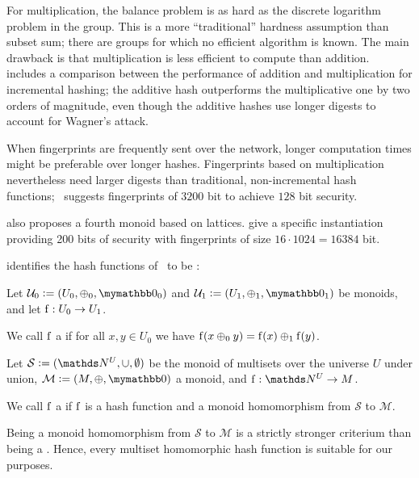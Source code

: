 \documentclass[conference]{IEEEtran}
\begin{document}
For multiplication, the balance problem is as hard as the discrete logarithm problem in the group. This is a more ``traditional'' hardness assumption than subset sum; there are groups for which no efficient algorithm is known. The main drawback is that multiplication is less efficient to compute than addition.~\cite{stanton2010fastad} includes a comparison between the performance of addition and multiplication for incremental hashing; the additive hash outperforms the multiplicative one by two orders of magnitude, even though the additive hashes use longer digests to account for Wagner's attack.

When fingerprints are frequently sent over the network, longer computation times might be preferable over longer hashes. Fingerprints based on multiplication nevertheless need larger digests than traditional, non-incremental hash functions;~\cite{maitin2017elliptic} suggests fingerprints of $3200$ bit to achieve $128$ bit security.

\cite{bellare1997new} also proposes a fourth monoid based on lattices. \cite{lewi2019securing} give a specific instantiation providing 200 bits of security with fingerprints of size $16 \cdot 1024 = 16384$ bit.

\cite{clarke2003incremental} identifies the hash functions of~\cite{bellare1997new} to be :

\begin{definition}
Let $\mathcal{U}_0 \defeq (U_0, \groupaddsym_0, \neutraladd_0)$ and $\mathcal{U}_1 \defeq (U_1, \groupaddsym_1, \neutraladd_1)$ be monoids, and let ${\operatorname{f}}: {U_0} \rightarrow {U_1}$.

We call $\operatorname{f}$ a  if for all $x, y \in U_0$ we have $\operatorname{f}(x \oplus_0 y) = \operatorname{f}(x) \oplus_1 \operatorname{f}(y)$.
\end{definition}

\begin{definition}
Let $\mathcal{S} \defeq (\N^U, \cup, \emptyset)$ be the monoid of multisets over the universe $U$ under union, $\mathcal{M} \defeq (M, \groupaddsym, \neutraladd)$ a monoid, and $\fun{\f}{\N^U}{M}$.

We call $\operatorname{f}$ a  if $\operatorname{f}$ is a hash function and a monoid homomorphism from $\mathcal{S}$ to $\mathcal{M}$.
\end{definition}

Being a monoid homomorphism from $\mathcal{S}$ to $\mathcal{M}$ is a strictly stronger criterium than being a \somewhatmorphism{}. Hence, every multiset homomorphic hash function is suitable for our purposes.
\end{document}
